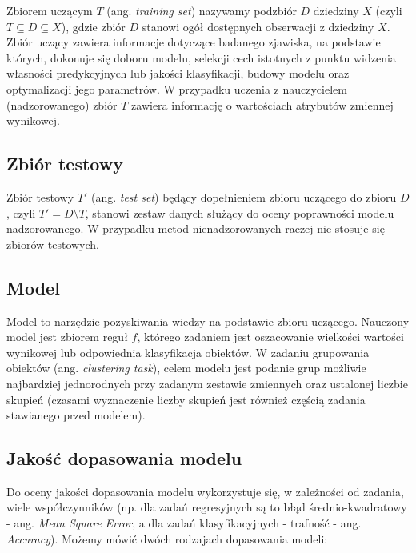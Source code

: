 \documentclass[]{book}
\theoremstyle{plain}
\theoremstyle{definition}
\theoremstyle{definition}
\theoremstyle{definition}
\theoremstyle{definition}
\theoremstyle{remark}
\begin{document}
Zbiorem uczącym \(T\) (ang. \emph{training set}) nazywamy podzbiór \(D\) dziedziny \(X\) (czyli \(T\subseteq D\subseteq X\)), gdzie zbiór \(D\) stanowi ogół dostępnych obserwacji z dziedziny \(X\). Zbiór uczący zawiera informacje dotyczące badanego zjawiska, na podstawie których, dokonuje się doboru modelu, selekcji cech istotnych z punktu widzenia własności predykcyjnych lub jakości klasyfikacji, budowy modelu oraz optymalizacji jego parametrów. W przypadku uczenia z nauczycielem (nadzorowanego) zbiór \(T\) zawiera informację o wartościach atrybutów zmiennej wynikowej.

\hypertarget{zbior-testowy}{%
\subsection{Zbiór testowy}\label{zbior-testowy}}

Zbiór testowy \(T'\) (ang. \emph{test set}) będący dopełnieniem zbioru uczącego do zbioru \(D\), czyli \(T'=D\setminus T\), stanowi zestaw danych służący do oceny poprawności modelu nadzorowanego. W przypadku metod nienadzorowanych raczej nie stosuje się zbiorów testowych.

\hypertarget{model}{%
\subsection{Model}\label{model}}

Model to narzędzie pozyskiwania wiedzy na podstawie zbioru uczącego. Nauczony model jest zbiorem reguł \(f\), którego zadaniem jest oszacowanie wielkości wartości wynikowej lub odpowiednia klasyfikacja obiektów. W zadaniu grupowania obiektów (ang. \emph{clustering task}), celem modelu jest podanie grup możliwie najbardziej jednorodnych przy zadanym zestawie zmiennych oraz ustalonej liczbie skupień (czasami wyznaczenie liczby skupień jest również częścią zadania stawianego przed modelem).

\hypertarget{jakosc-dopasowania-modelu}{%
\subsection{Jakość dopasowania modelu}\label{jakosc-dopasowania-modelu}}

Do oceny jakości dopasowania modelu wykorzystuje się, w zależności od zadania, wiele współczynników (np. dla zadań regresyjnych są to błąd średnio-kwadratowy - ang. \emph{Mean Square Error}, a dla zadań klasyfikacyjnych - trafność - ang. \emph{Accuracy}). Możemy mówić dwóch rodzajach dopasowania modeli:
\end{document}
